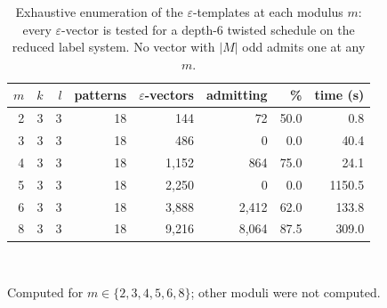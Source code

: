 \begin{table}[tb]
\centering
\small
\caption{Exhaustive enumeration of the $\varepsilon$-templates at each modulus $m$: every $\varepsilon$-vector is tested for a depth-6 twisted schedule on the reduced label system.  No vector with $|M|$ odd admits one at any $m$.}
\label{tabS:templates}
\begin{tabular}{rrrrrrrr}
\toprule
$m$ & $k$ & $l$ & patterns & $\varepsilon$-vectors & admitting & \% & time (s) \\
\midrule
2 & 3 & 3 & 18 & 144 & 72 & 50.0 & 0.8 \\
3 & 3 & 3 & 18 & 486 & 0 & 0.0 & 40.4 \\
4 & 3 & 3 & 18 & 1,152 & 864 & 75.0 & 24.1 \\
5 & 3 & 3 & 18 & 2,250 & 0 & 0.0 & 1150.5 \\
6 & 3 & 3 & 18 & 3,888 & 2,412 & 62.0 & 133.8 \\
8 & 3 & 3 & 18 & 9,216 & 8,064 & 87.5 & 309.0 \\
\bottomrule
\end{tabular}
\\[2pt]\begin{minipage}{\linewidth}\footnotesize Computed for $m \in \{2, 3, 4, 5, 6, 8\}$; other moduli were not computed.\end{minipage}
\end{table}
